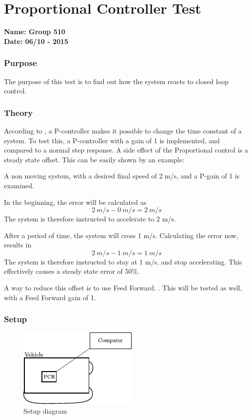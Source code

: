 \pagebreak
\section{Proportional Controller Test} \label{app:proportionalControllerTest}
\textbf{Name: Group 510}\\
\textbf{Date: 06/10 - 2015}

\subsubsection{Purpose}
The purpose of this test is to find out how the system reacts to closed loop control.

\subsubsection{Theory}
According to , a P-controller makes it possible to change the time constant of a system. To test this, a P-controller with a gain of 1 is implemented, and compared to a normal step response.
A side effect of the Proportional control is a steady state offset. This can be easily shown by an example:

A non moving system, with a desired final speed of 2 m/s, and a P-gain of 1 is examined.

In the beginning, the error will be calculated as $$\SI{2}{m/s} - \SI{0}{m/s} = \SI{2}{m/s}$$
The system is therefore instructed to accelerate to 2 m/s.

After a period of time, the system will cross 1 m/s. Calculating the error now, results in $$\SI{2}{m/s}-\SI{1}{m/s}=\SI{1}{m/s}$$
The system is therefore instructed to stay at 1 m/s, and stop accelerating. This effectively causes a steady state error of 50\%.

A way to reduce this offset is to use Feed Forward. . This will be tested as well, with a Feed Forward gain of 1.

\subsubsection{Setup}

\begin{figure}[H]
	\centering
	\includegraphics[scale=1.6]{figures/inertiaTestSetupDiagram2.pdf}
	\caption{Setup diagram}
	\label{GainAndTimeTestSetupDiagram}
\end{figure}


